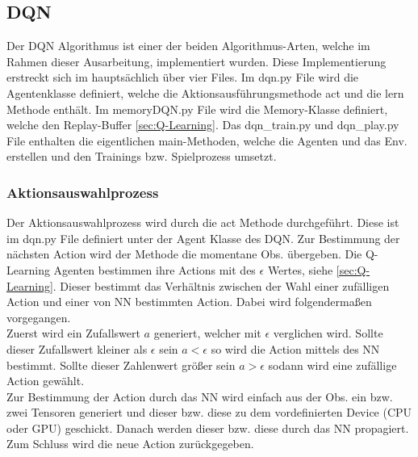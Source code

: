 \subsection{DQN}
Der DQN Algorithmus ist einer der beiden Algorithmus-Arten, welche im Rahmen dieser Ausarbeitung, implementiert wurden. Diese Implementierung erstreckt sich im hauptsächlich über vier Files.
Im dqn.py File wird die Agentenklasse definiert, welche die Aktionsausführungsmethode act und die lern Methode enthält. 
Im memoryDQN.py File wird die Memory-Klasse definiert, welche den Replay-Buffer \ref{sec:Q-Learning}. Das dqn\_train.py und dqn\_play.py File enthalten die eigentlichen main-Methoden, welche die Agenten und das Env. erstellen und den Trainings bzw. Spielprozess umsetzt.

\subsubsection{Aktionsauswahlprozess}
Der Aktionsauswahlprozess wird durch die act Methode durchgeführt. Diese ist im dqn.py File definiert unter der Agent Klasse des DQN. Zur Bestimmung der nächsten Action wird der Methode die momentane Obs. übergeben.
Die Q-Learning Agenten bestimmen ihre Actions mit des $\epsilon$ Wertes, siehe \ref{sec:Q-Learning}. Dieser bestimmt das Verhältnis zwischen der Wahl einer zufälligen Action und einer von NN bestimmten Action. Dabei wird folgendermaßen vorgegangen.\\
Zuerst wird ein Zufallswert $a$ generiert, welcher mit $\epsilon$ verglichen wird. Sollte dieser Zufallswert kleiner als $\epsilon$ sein $a < \epsilon$ so wird die Action mittels des NN bestimmt. Sollte dieser Zahlenwert größer sein $a > \epsilon $ sodann wird eine zufällige Action gewählt.\\
Zur Bestimmung der Action durch das NN wird einfach aus der Obs. ein bzw. zwei Tensoren generiert und dieser bzw. diese zu dem vordefinierten Device (CPU oder GPU) geschickt. Danach werden dieser bzw. diese durch das NN propagiert. Zum Schluss wird die neue Action zurückgegeben.

